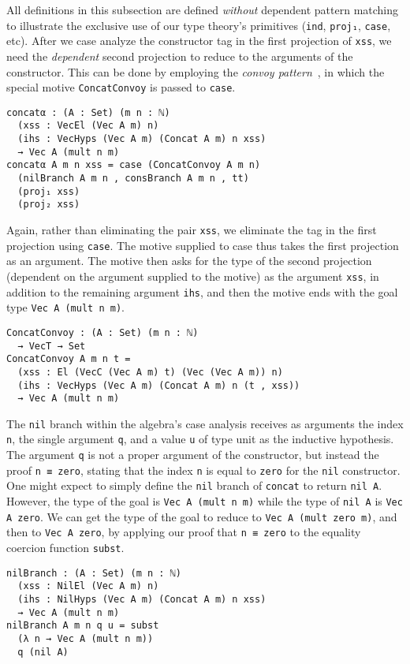\documentclass[preprint,nonatbib]{sigplanconf}
\begin{document}
All definitions in this subsection are defined {\it without} dependent
pattern matching to illustrate the exclusive use of our type theory's
primitives ({\tt ind}, {\tt proj₁}, {\tt case}, etc). After we case
analyze the constructor tag in the first projection of {\tt xss}, we
need the {\it dependent} second projection to reduce to the arguments
of the constructor. This can be done by employing the
{\it convoy pattern}~\citep{TODO}, in which the special motive
{\tt ConcatConvoy} is passed to {\tt case}.

\begin{verbatim}
concatα : (A : Set) (m n : ℕ)
  (xss : VecEl (Vec A m) n)
  (ihs : VecHyps (Vec A m) (Concat A m) n xss)
  → Vec A (mult n m)
concatα A m n xss = case (ConcatConvoy A m n)
  (nilBranch A m n , consBranch A m n , tt)
  (proj₁ xss)
  (proj₂ xss)
\end{verbatim}

Again, rather than eliminating the pair {\tt xss}, we eliminate the
tag in the first projection using {\tt case}. The motive supplied to
case thus takes the first projection as an argument. The motive then
asks for the type of the second projection (dependent on the argument
supplied to the motive) as the argument {\tt xss}, in addition to the
remaining argument {\tt ihs}, and then the motive ends with the goal type
{\tt Vec A (mult n m)}.

\begin{verbatim}
ConcatConvoy : (A : Set) (m n : ℕ)
  → VecT → Set
ConcatConvoy A m n t =
  (xss : El (VecC (Vec A m) t) (Vec (Vec A m)) n)
  (ihs : VecHyps (Vec A m) (Concat A m) n (t , xss))
  → Vec A (mult n m)
\end{verbatim}

The {\tt nil} branch within the algebra's case analysis receives as
arguments the index {\tt n}, the single argument {\tt q}, and a value
{\tt u} of type unit as the inductive hypothesis. The argument
{\tt q} is not a proper argument of the constructor, but instead the
proof {\tt n ≡ zero}, stating that the index {\tt n} is equal to
{\tt zero} for the {\tt nil} constructor. One might expect to simply
define the {\tt nil} branch of {\tt concat} to return {\tt nil A}.
However, the type of the goal is {\tt Vec A (mult n m)} while the type
of {\tt nil A} is {\tt Vec A zero}. We can get the type of the goal to
reduce to {\tt Vec A (mult zero m)}, and then to {\tt Vec A zero}, by
applying our proof that {\tt n ≡ zero} to the equality coercion
function {\tt subst}.

\begin{verbatim}
nilBranch : (A : Set) (m n : ℕ)
  (xss : NilEl (Vec A m) n)
  (ihs : NilHyps (Vec A m) (Concat A m) n xss)
  → Vec A (mult n m)
nilBranch A m n q u = subst
  (λ n → Vec A (mult n m))
  q (nil A)
\end{verbatim}
\end{document}
